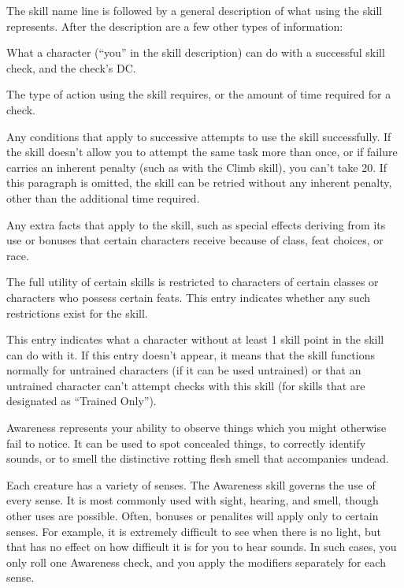\par The skill name line is followed by a general description of what using the skill represents. After the description are a few other types of information:

 What a character (``you'' in the skill description) can do with a successful skill check, and the check's DC.

 The type of action using the skill requires, or the amount of time required for a check.

 Any conditions that apply to successive attempts to use the skill successfully. If the skill doesn't allow you to attempt the same task more than once, or if failure carries an inherent penalty (such as with the Climb skill), you can't take 20. If this paragraph is omitted, the skill can be retried without any inherent penalty, other than the additional time required.

 Any extra facts that apply to the skill, such as special effects deriving from its use or bonuses that certain characters receive because of class, feat choices, or race.

 The full utility of certain skills is restricted to characters of certain classes or characters who possess certain feats. This entry indicates whether any such restrictions exist for the skill.

 This entry indicates what a character without at least 1 skill point in the skill can do with it. If this entry doesn't appear, it means that the skill functions normally for untrained characters (if it can be used untrained) or that an untrained character can't attempt checks with this skill (for skills that are designated as ``Trained Only'').

Awareness represents your ability to observe things which you might otherwise fail to notice. It can be used to spot concealed things, to correctly identify sounds, or to smell the distinctive rotting flesh smell that accompanies undead.

Each creature has a variety of senses. The Awareness skill governs the use of every sense. It is most commonly used with sight, hearing, and smell, though other uses are possible. Often, bonuses or penalites will apply only to certain senses. For example, it is extremely difficult to see when there is no light, but that has no effect on how difficult it is for you to hear sounds. In such cases, you only roll one Awareness check, and you apply the modifiers separately for each sense. 

